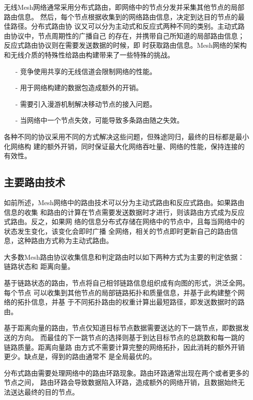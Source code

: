 无线Mesh网络通常采用分布式路由，即网络中的节点分发并采集其他节点的局部路由信息。
然后，每个节点根据收集到的网络路由信息，决定到达目的节点的最佳路径。分布式路由协
议又可以分为主动式和反应式两种不同的类别。主动式路由协议中，节点周期性的广播自己
的存在，并携带自己所知道的局部路由信息；反应式路由协议则在需要发送数据的时候，即
时获取路由信息。Mesh网络的架构和无线介质的特殊性给路由构建带来了一些特殊的挑战。

\begin{itemize}
  \item[-] 竞争使用共享的无线信道会限制网络的性能。
  \item[-] 用于网络构建的数据包造成额外的开销。
  \item[-] 需要引入漫游机制解决移动节点的接入问题。
  \item[-] 当网络中一个节点失效，可能导致多条路由随之失效。
\end{itemize}

各种不同的协议采用不同的方式解决这些问题，但殊途同归，最终的目标都是最小化网络构
建的额外开销，同时保证最大化网络吞吐量、网络的性能，保持连接的有效性。

\subsection{主要路由技术}
如前所述，Mesh网络中的路由技术可以分为主动式路由和反应式路由。如果路由信息的收集
和路由的计算在节点需要发送数据时才进行，则该路由方式成为反应式路由。反之，如果网
络的信息分布式存储在网络中的节点中，且每当网络中的状态发生变化，该变化会即时广播
全网络，相关的节点即时更新自己的路由信息，这种路由方式称为主动式路由。

大多数Mesh路由协议收集信息和判定路由时以如下两种方式为主要的判定依据：链路状态和
距离向量。

基于链路状态的路由，节点将自己相邻链路信息组织成有向图的形式，洪泛全网。每个节点
可以收集到其他节点的局部链路拓扑和质量信息，并基于此构建整个网络的拓扑信息，并基
于不同拓扑路由的权重计算出最短路径，即发送数据时的路由。

基于距离向量的路由，节点仅知道目标节点数据需要送达的下一跳节点，即数据发送的方向。
而最佳的下一跳节点的选择则基于到达目标节点的总跳数和每一跳的链路质量。距离向量路
由方式不需要计算完整的网络拓扑，因此消耗的额外开销更少。缺点是，得到的路由通常不
是全局最优的。

分布式路由需要处理网络中的路由环路现象。路由环路通常出现在两个或者更多的节点之间，
路由环路会导致数据陷入环路，造成额外的网络开销，且数据始终无法送达最终的目的节点。

